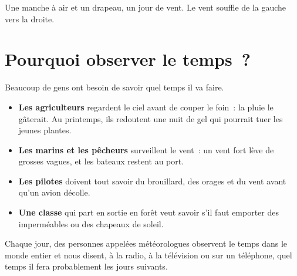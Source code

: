 \begin{omfigure}

{\small Une manche à air et un drapeau, un jour de vent. Le vent souffle de
la gauche vers la droite.}
\end{omfigure}

\section{Pourquoi observer le temps~?}

Beaucoup de gens ont besoin de savoir quel temps il va faire.
\begin{itemize}
  \item \textbf{Les agriculteurs} regardent le ciel avant de couper le
        foin~: la pluie le gâterait. Au printemps, ils redoutent une nuit
        de gel qui pourrait tuer les jeunes plantes.
  \item \textbf{Les marins et les pêcheurs} surveillent le vent~: un vent
        fort lève de grosses vagues, et les bateaux restent au port.
  \item \textbf{Les pilotes} doivent tout savoir du brouillard, des
        orages et du vent avant qu'un avion décolle.
  \item \textbf{Une classe} qui part en sortie en forêt veut savoir s'il
        faut emporter des imperméables ou des chapeaux de soleil.
\end{itemize}
Chaque jour, des personnes appelées météorologues observent le temps dans
le monde entier et nous disent, à la radio, à la télévision ou sur un
téléphone, quel temps il fera probablement les jours suivants.

